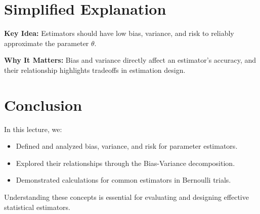 \documentclass{article}
\begin{document}
\section*{Simplified Explanation}

\textbf{Key Idea:}
Estimators should have low bias, variance, and risk to reliably approximate the parameter $\theta$.

\textbf{Why It Matters:}
Bias and variance directly affect an estimator's accuracy, and their relationship highlights tradeoffs in estimation design.

\section*{Conclusion}

In this lecture, we:
\begin{itemize}
  \item Defined and analyzed bias, variance, and risk for parameter estimators.
  \item Explored their relationships through the Bias-Variance decomposition.
  \item Demonstrated calculations for common estimators in Bernoulli trials.
\end{itemize}

Understanding these concepts is essential for evaluating and designing effective statistical estimators.
\end{document}
